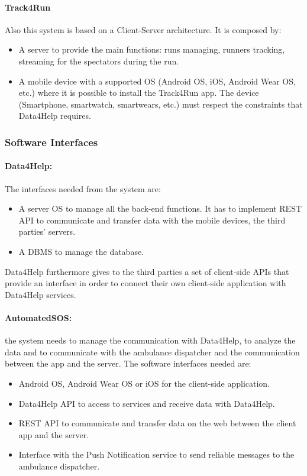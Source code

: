 \documentclass[a4paper]{article}
\begin{document}
\paragraph{Track4Run} Also this system is based on a Client-Server architecture. It is composed by:
\begin{itemize}
    \item A server to provide the main functions: runs managing, runners tracking, streaming for the spectators during the run.
    \item A mobile device with a supported OS (Android OS, iOS, Android Wear OS, etc.) where it is possible to install the Track4Run app. The device (Smartphone, smartwatch, smartwears, etc.) must respect the constraints that Data4Help requires.
\end{itemize}
\clearpage

\subsubsection{Software Interfaces}

\paragraph{Data4Help:} The interfaces needed from the system are:
\begin{itemize}
    \item A server OS to manage all the back-end functions. It has to implement REST API to communicate and transfer data with the mobile devices, the third parties' servers.
    \item A DBMS to manage the database.
\end{itemize}
Data4Help furthermore gives to the third parties a set of client-side APIs that provide an interface in order to connect their own client-side application with Data4Help services.

\paragraph{AutomatedSOS:} the system needs to manage the communication with Data4Help, to analyze the data and to communicate with the ambulance dispatcher and the communication between the app and the server. The software interfaces needed are:

\begin{itemize}
    \item Android OS, Android Wear OS or iOS for the client-side application.
    \item Data4Help API to access to services and receive data with Data4Help.
    \item REST API to communicate and transfer data on the web between the client app and the server.
    \item Interface with the Push Notification service to send reliable messages to the ambulance dispatcher.
\end{itemize}
\end{document}
